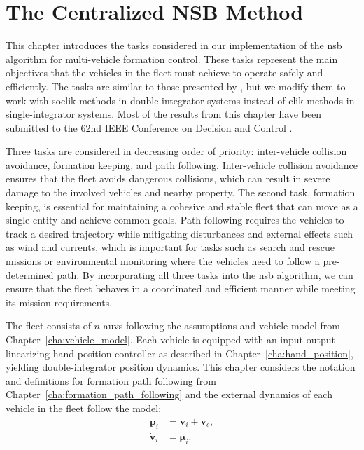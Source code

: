\chapter{The Centralized NSB Method}\label{cha:nsb_tasks}
This chapter introduces the tasks considered in our implementation of the \gls{nsb} algorithm for multi-vehicle formation control. These tasks represent the main objectives that the vehicles in the fleet must achieve to operate safely and efficiently. The tasks are similar to those presented by \cite{matous_singularity-free_2022}, but we modify them to work with \gls{soclik} methods in double-integrator systems instead of \gls{clik} methods in single-integrator systems. Most of the results from this chapter have been submitted to the 62nd IEEE Conference on Decision and Control \citep{lie_formation_2023}.

Three tasks are considered in decreasing order of priority: inter-vehicle collision avoidance, formation keeping, and path following. Inter-vehicle collision avoidance ensures that the fleet avoids dangerous collisions, which can result in severe damage to the involved vehicles and nearby property. The second task, formation keeping, is essential for maintaining a cohesive and stable fleet that can move as a single entity and achieve common goals. Path following requires the vehicles to track a desired trajectory while mitigating disturbances and external effects such as wind and currents, which is important for tasks such as search and rescue missions or environmental monitoring where the vehicles need to follow a pre-determined path. By incorporating all three tasks into the \gls{nsb} algorithm, we can ensure that the fleet behaves in a coordinated and efficient manner while meeting its mission requirements.

The fleet consists of $n$ \glspl{auv} following the assumptions and vehicle model from Chapter~\ref{cha:vehicle_model}. Each vehicle is equipped with an input-output linearizing hand-position controller as described in Chapter~\ref{cha:hand_position}, yielding double-integrator position dynamics. This chapter considers the notation and definitions for formation path following from Chapter~\ref{cha:formation_path_following} and the external dynamics of each vehicle in the fleet follow the model:
\begin{equation}\label{eq:feedback_linearized_dynamics}
\begin{aligned}
    \dot{\mathbf{p}}_i &= \mathbf{v}_i + \mathbf{v}_c,\\
    \dot{\mathbf{v}}_i &= \bm{\mu}_i.
\end{aligned}
\end{equation}


